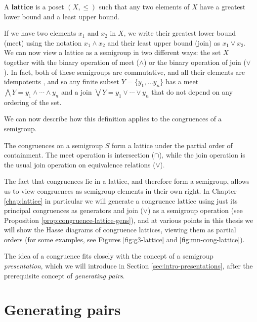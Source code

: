 \begin{definition}
  \label{def:lattice}
  A \textbf{lattice} is a poset $(X, \leq)$ such that any two elements of $X$ have
  a greatest lower bound and a least upper bound.
\end{definition}

If we have two elements $x_1$ and $x_2$ in $X$, we write their greatest lower
bound (meet) using the notation $x_1 \wedge x_2$ and their least upper bound
(join) as $x_1 \vee x_2$.
We can now view a lattice as a semigroup in two different ways:
the set $X$ together with the binary operation of meet ($\wedge$) or the binary
operation of join ($\vee$).
In fact, both of these semigroups are commutative, and all their elements are
idempotents \cite[Proposition 1.3.2]{howie}, and so any finite subset
$Y = \{y_1, \ldots y_n\}$ has a meet
$\bigwedge Y = y_1 \wedge \cdots \wedge y_n$ and a join
$\bigvee Y = y_1 \vee \cdots \vee y_n$ that do not depend on any ordering of the
set.

We can now describe how this definition applies to the congruences of a
semigroup.

\begin{proposition}
  \label{prop:cong-lattice}
  The congruences on a semigroup $S$ form a lattice under the partial order of
  containment.  The meet operation is intersection ($\cap$), while the join
  operation is the usual join operation on equivalence relations ($\vee$).
\end{proposition}

The fact that congruences lie in a lattice, and therefore form a semigroup,
allows us to view congruences as semigroup elements
in their own right.  In Chapter \ref{chap:lattice} in particular we will
generate a congruence lattice using just its principal congruences as generators
and join ($\vee$) as a semigroup operation (see Proposition
\ref{prop:congruence-lattice-gens}), and at various points in this thesis
we will show the Hasse diagrams of congruence lattices, viewing them as partial
orders (for some examples, see Figures \ref{fig:g3-lattice} and
\ref{fig:mn-cong-lattice}).

The idea of a congruence fits closely with the concept of a semigroup
\textit{presentation}, which we will introduce in Section
\ref{sec:intro-presentations}, after the prerequisite concept of
\textit{generating pairs}.

\section{Generating pairs}
\label{sec:intro-gen-pairs}

